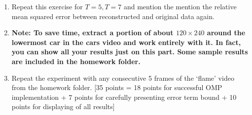 \documentclass[11pt]{article}
\begin{document}
\begin{enumerate}
\begin{enumerate}
\item Repeat this exercise for $T = 5, T = 7$ and mention the mention the relative mean squared error between reconstructed and original data again.
\item \textbf{Note: To save time, extract a portion of about $120 \times 240$ around the lowermost car in the cars video and work entirely with it. In fact, you can show all your results just on this part. Some sample results are included in the homework folder.}
\item Repeat the experiment with any consecutive 5 frames of the `flame' video from the homework folder. 
\textsf{[35 points = 18 points for successful OMP implementation + 7 points for carefully presenting error term bound + 10 points for displaying of all results]}
\end{enumerate}


\end{enumerate}
\end{document}
